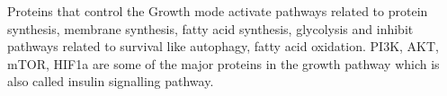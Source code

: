 Proteins that control the Growth mode activate pathways related to protein synthesis, membrane synthesis, fatty acid synthesis, glycolysis and inhibit pathways related to survival like autophagy, fatty acid oxidation.
PI3K, AKT, mTOR, HIF1a are some of the major proteins in the growth pathway which is also called insulin signalling pathway.  
